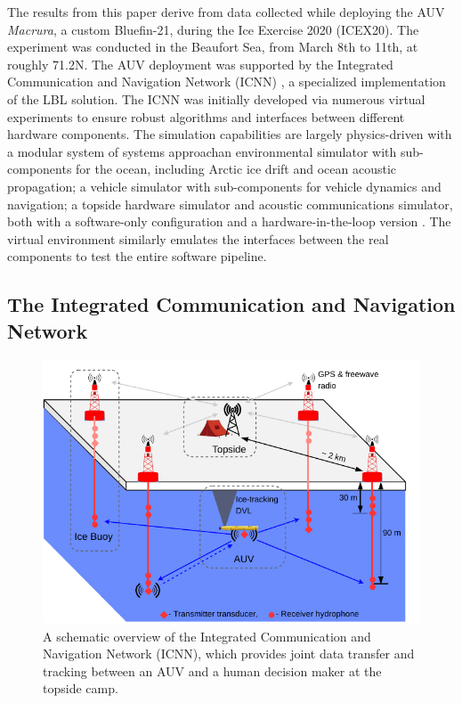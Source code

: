 \documentclass[preprint,TurnOnLineNumbers]{JASA}
\begin{document}
The results from this paper derive from data collected while deploying the AUV \emph{Macrura}, a custom Bluefin-21, during the Ice Exercise 2020 (ICEX20).
The experiment was conducted in the Beaufort Sea, from March 8th to 11th, at roughly 71.2\textdegree N.
The AUV deployment was supported by the Integrated Communication and Navigation Network (ICNN) \citep{schneider_self-adapting_2020,Randeni2020}, a specialized implementation of the LBL solution.
The ICNN was initially developed via numerous virtual experiments to ensure robust algorithms and interfaces between different hardware components. 
The simulation capabilities are largely physics-driven with a modular system of systems approach\textemdash an environmental simulator with sub-components for the ocean, including Arctic ice drift and ocean acoustic propagation; a vehicle simulator with sub-components for vehicle dynamics and navigation; a topside hardware simulator and acoustic communications simulator, both with a software-only configuration and a hardware-in-the-loop version \citep{schneider_netsim_2018}.
The virtual environment similarly emulates the interfaces between the real components to test the entire software pipeline.

\subsection{The Integrated Communication and Navigation Network}

\begin{figure}[!ht]
    \centering
    \includegraphics[width=0.8\columnwidth]{Fig1.pdf}
    \caption{A schematic overview of the Integrated Communication and Navigation Network (ICNN), which provides joint data transfer and tracking between an AUV and a human decision maker at the topside camp.}
    \label{fig:icnnOverview}
\end{figure}
\end{document}
